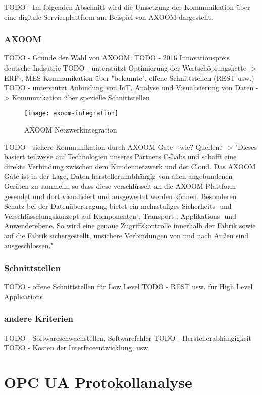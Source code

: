 TODO - Im folgenden Abschnitt wird die Umsetzung der Kommunikation über eine digitale Serviceplattform am Beispiel von AXOOM dargestellt.

\subsubsection{AXOOM}
TODO - Gründe der Wahl von AXOOM: 
TODO - 2016 Innovationspreis deutsche Indsutrie
TODO - unterstützt Optimierung der Wertschöpfungskette -> ERP-, MES Kommunikation über "bekannte", offene Schnittstellen (REST usw.) 
TODO - unterstützt Anbindung von \ac{IoT}. Analyse und Visualisierung von Daten -> Kommunikation über spezielle Schnittstellen

\begin{figure}[h]
    \centering
    \texttt{[image: axoom-integration]}
    \caption{AXOOM Netzwerkintegration}
    \label{Kap3:AXOOM Netzwerkintegration}
  \end{figure}
  
\clearpage

TODO - sichere Kommunikation durch AXOOM Gate - wie? Quellen? -> "Dieses basiert teilweise auf Technologien unseres Partners C-Labs und schafft eine direkte Verbindung zwischen dem Kundennetzwerk und der Cloud. Das AXOOM Gate ist in der Lage, Daten herstellerunabhängig von allen angebundenen Geräten zu sammeln, so dass diese verschlüsselt an die AXOOM Plattform gesendet und dort visualisiert und ausgewertet werden können. Besonderen Schutz bei der Datenübertragung bietet ein mehrstufiges Sicherheits- und Verschlüsselungskonzept auf Komponenten-, Transport-, Applikations- und Anwenderebene. So wird eine genaue Zugriffskontrolle innerhalb der Fabrik sowie auf die Fabrik sichergestellt, unsichere Verbindungen von und nach Außen sind ausgeschlossen."

\subsubsection{Schnittstellen}
TODO - offene Schnittstellen für Low Level
TODO - REST usw. für High Level Applications

\subsubsection{andere Kriterien}
TODO - Softwareschwachstellen, Softwarefehler 
TODO - Herstellerabhängigkeit
TODO - Kosten der Interfaceentwicklung, usw.

\section{\ac{OPC UA} Protokollanalyse}

